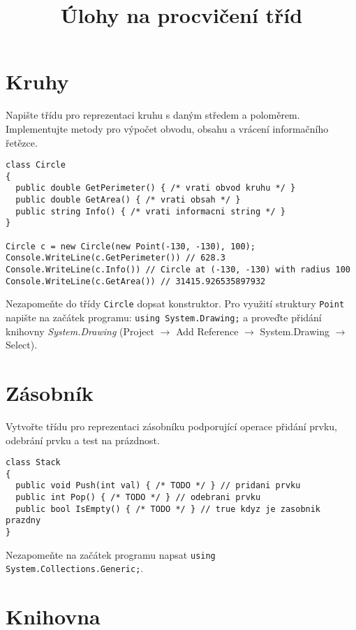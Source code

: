 \documentclass[12pt,a4paper]{article}
\begin{document}
\pagestyle{empty}
\title{Úlohy na procvičení tříd}
\date{\vspace{-12ex}}
\setlength{\droptitle}{-6em}
\setlength{\parindent}{0cm}
\maketitle

\section{Kruhy}

Napište třídu pro reprezentaci kruhu s daným středem a poloměrem. Implementujte
metody pro výpočet obvodu, obsahu a vrácení informačního řetězce.

\begin{verbatim}
class Circle
{
  public double GetPerimeter() { /* vrati obvod kruhu */ }
  public double GetArea() { /* vrati obsah */ }
  public string Info() { /* vrati informacni string */ }
}

Circle c = new Circle(new Point(-130, -130), 100);
Console.WriteLine(c.GetPerimeter()) // 628.3
Console.WriteLine(c.Info()) // Circle at (-130, -130) with radius 100
Console.WriteLine(c.GetArea()) // 31415.926535897932
\end{verbatim}

Nezapomeňte do třídy \texttt{Circle} dopsat konstruktor. Pro využití struktury
\texttt{Point} napište na začátek programu: \texttt{using System.Drawing;}
a proveďte přidání knihovny \textit{System.Drawing} (Project $\rightarrow$
Add Reference $\rightarrow$ System.Drawing $\rightarrow$ Select).

\section{Zásobník}

Vytvořte třídu pro reprezentaci zásobníku podporující operace přidání prvku,
odebrání prvku a test na prázdnost.

\begin{verbatim}
class Stack
{
  public void Push(int val) { /* TODO */ } // pridani prvku
  public int Pop() { /* TODO */ } // odebrani prvku
  public bool IsEmpty() { /* TODO */ } // true kdyz je zasobnik prazdny
}
\end{verbatim}

Nezapomeňte na začátek programu napsat
\texttt{using System.Collections.Generic;}.

\section{Knihovna}
\end{document}
